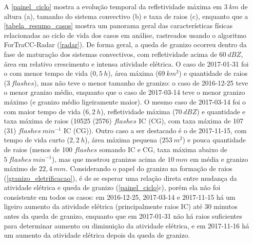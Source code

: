 A \autoref{painel_ciclo} mostra a evolução temporal da refletividade máxima em $3\:km$ de altura (a), tamanho do sistema convectivo (b) e taxa de raios (c), enquanto que a \autoref{tabela_resumo_casos} mostra um panorama geral das características físicas relacionadas ao ciclo de vida dos casos em análise, rastreados usando o algoritmo ForTraCC-Radar (\autoref{radar}). De forma geral, a queda de granizo ocorreu dentro da fase de maturação dos sistemas convectivos, com refletividade acima de $60\:dBZ$, área em relativo crescimento e intensa atividade elétrica. O caso de 2017-01-31 foi o com menor tempo de vida ($0,5\:h$), área máxima ($69\:km^2$) e quantidade de raios ($3\:flashes$), mas não teve o menor tamanho de granizo: o caso de 2016-12-25 teve o menor granizo médio, enquanto que o caso de 2017-03-14 teve o menor granizo máximo (e granizo médio ligeiramente maior). O mesmo caso de 2017-03-14 foi o com maior tempo de vida ($6,2\:h$), refletividade máxima ($70\:dBZ$) e quantidade e taxa máxima de raios (10525 (2576) $flashes$ IC (CG), com taxa máxima de 107 (31) $flashes\:min^{-1}$ IC (CG)). Outro caso a ser destacado é o de 2017-11-15, com tempo de vida curto ($2,2\:h$), área máxima pequena ($253\:m^2$) e pouca quantidade de raios (menos de 100 $flashes$ somando IC e CG, taxa máxima abaixo de $5\:flashes\:min^{-1}$), mas que mostrou granizos acima de $10\:mm$ em média e granizo máximo de $22,4\:mm$. Considerando o papel do granizo na formação de raios (\autoref{granizo_eletrificacao}), é de se esperar uma relação direta entre mudança da atividade elétrica e queda de granizo (\autoref{painel_ciclo}c), porém ela não foi consistente em todos os casos: em 2016-12-25, 2017-03-14 e 2017-11-15 há um ligeiro aumento da atividade elétrica (principalmente raios IC) até 30 minutos antes da queda de granizo, enquanto que em 2017-01-31 não há raios suficientes para determinar aumento ou diminuição da atividade elétrica, e em 2017-11-16 há um aumento da atividade elétrica depois da queda de granizo.

